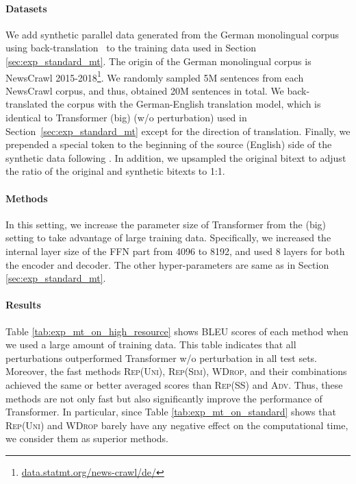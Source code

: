 \documentclass[11pt]{article}
\newcommand{\tagforbt}{}
\newcommand{\uniform}{\textsc{Rep(Uni)}}
\newcommand{\parass}{\textsc{Rep(SS)}}
\newcommand{\similarity}{\textsc{Rep(Sim)}}
\newcommand{\worddrop}{\textsc{WDrop}}
\newcommand{\adv}{\textsc{Adv}}
\begin{document}
\paragraph{Datasets}
We add synthetic parallel data generated from the German monolingual corpus using back-translation~\citep{sennrich:2016:backtrans} to the training data used in Section \ref{sec:exp_standard_mt}.
The origin of the German monolingual corpus is NewsCrawl 2015-2018\footnote{\href{http://data.statmt.org/news-crawl/de/}{data.statmt.org/news-crawl/de/}}.
We randomly sampled 5M sentences from each NewsCrawl corpus, and thus, obtained 20M sentences in total.
We back-translated the corpus with the German-English translation model, which is identical to Transformer (big) (w/o perturbation) used in Section~\ref{sec:exp_standard_mt} except for the direction of translation.
Finally, we prepended a special token \tagforbt{} to the beginning of the source (English) side of the synthetic data following \citep{caswell:2019:tagged}.
In addition, we upsampled the original bitext to adjust the ratio of the original and synthetic bitexts to 1:1.


\paragraph{Methods}
In this setting, we increase the parameter size of Transformer from the (big) setting to take advantage of large training data.
Specifically, we increased the internal layer size of the FFN part from 4096 to 8192, and used 8 layers for both the encoder and decoder.
The other hyper-parameters are same as in Section \ref{sec:exp_standard_mt}.


\paragraph{Results}
Table \ref{tab:exp_mt_on_high_resource} shows BLEU scores of each method when we used a large amount of training data.
This table indicates that all perturbations outperformed Transformer w/o perturbation in all test sets.
Moreover, the fast methods \uniform{}, \similarity{}, \worddrop{}, and their combinations achieved the same or better averaged scores than \parass{} and \adv{}.
Thus, these methods are not only fast but also significantly improve the performance of Transformer.
In particular, since Table \ref{tab:exp_mt_on_standard} shows that \uniform{} and \worddrop{} barely have any negative effect on the computational time, we consider them as superior methods.
\end{document}
